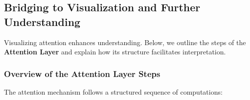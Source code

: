 \subsection{Bridging to Visualization and Further Understanding}
\label{sec:chapter17_attention_visualization}

\noindent Visualizing attention enhances understanding. Below, we outline the steps of the \textbf{Attention Layer} and explain how its structure facilitates interpretation.

\subsubsection{Overview of the Attention Layer Steps}

\noindent The attention mechanism follows a structured sequence of computations:

